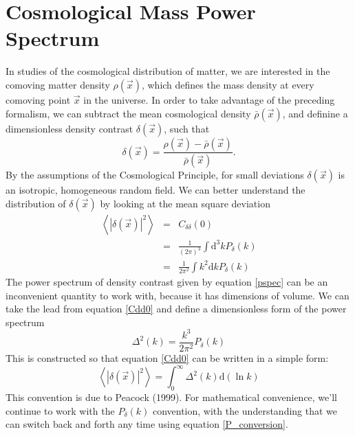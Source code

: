 \documentclass[12pt,preprint]{aastex}			%
\newcommand{\dd}{\mathrm{d}}
\begin{document}
\section{Cosmological Mass Power Spectrum}
In studies of the cosmological distribution of matter, we are interested
in the comoving matter density $\rho(\vec{x})$, which defines the mass 
density at every comoving point $\vec{x}$ in the universe.  In order
to take advantage of the preceding formalism, we can subtract the mean
cosmological density $\bar{\rho}(\vec{x})$, and definine a dimensionless
density contrast $\delta(\vec{x})$, such that
\begin{equation}
  \delta(\vec{x}) = \frac{\rho(\vec{x}) - \bar{\rho}(\vec{x})}{\bar{\rho}(\vec{x})}.
\end{equation}
By the assumptions of the Cosmological Principle, for small
deviations $\delta(\vec x)$ is an isotropic, homogeneous random field.  
We can better understand the distribution of $\delta(\vec x)$ by looking
at the mean square deviation
\begin{eqnarray}
  \label{Cdd0}
  \left\langle|\delta(\vec x)|^2\right\rangle 
  &=& C_{\delta\delta}(0)\nonumber\\
  &=& \frac{1}{(2\pi)^3}\int \dd^3 kP_\delta(k)\nonumber\\
  &=& \frac{1}{2\pi^2}\int k^2\dd k P_\delta(k)
\end{eqnarray}
The power spectrum of density contrast given by equation \ref{pspec}
can be an inconvenient quantity to work with, because it has dimensions
of volume.  We can take the lead from equation \ref{Cdd0} and define
a dimensionless form of the power spectrum
\begin{equation}
  \label{P_conversion}
 \Delta^2(k) = \frac{k^3}{2\pi^2} P_\delta(k)
\end{equation}
This is constructed so that equation \ref{Cdd0} can be written in a
simple form:
\begin{equation}
  \left\langle|\delta(\vec x)|^2\right\rangle 
  = \int_0^\infty \Delta^2(k)\dd(\ln k)
\end{equation}
This convention is due to Peacock (1999).
For mathematical convenience, we'll continue to work with 
the $P_\delta(k)$ convention,
with the understanding that we can switch back and forth any time using
equation \ref{P_conversion}. 
\end{document}
